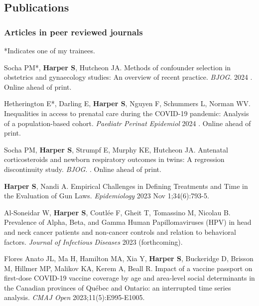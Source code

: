 \documentclass[
  letterpaper,
  DIV=11,
  numbers=noendperiod]{scrartcl}
\begin{document}
\hypertarget{publications}{%
\subsection{Publications}\label{publications}}

\hypertarget{articles-in-peer-reviewed-journals}{%
\subsubsection{Articles in peer reviewed
journals}\label{articles-in-peer-reviewed-journals}}

*Indicates one of my trainees.

\begin{etaremune}

\item Socha PM*, \textbf{Harper S}, Hutcheon JA. Methods of confounder selection in obstetrics and gynaecology studies: An overview of recent practice. \emph{BJOG}. 2024 . Online ahead of print.
 
\item Hetherington E*, Darling E, \textbf{Harper S}, Nguyen F, Schummers L, Norman WV. Inequalities in access to prenatal care during the COVID-19 pandemic: Analysis of a population-based cohort. \emph{Paediatr Perinat Epidemiol} 2024 . Online ahead of print.

\item *Socha PM, \textbf{Harper S}, Strumpf E, Murphy KE, Hutcheon JA. Antenatal corticosteroids and newborn respiratory outcomes in twins: A regression discontinuity study. \emph{BJOG}. . Online ahead of print.

\item \textbf{Harper S}, Nandi A. Empirical Challenges in Defining Treatments and Time in the Evaluation of Gun Laws. \emph{Epidemiology} 2023 Nov 1;34(6):793-5. 

\item *Al-Soneidar W, \textbf{Harper S}, Coutlée F, Gheit T, Tomassino M, Nicolau B. Prevalence of Alpha, Beta, and Gamma Human Papillomaviruses (HPV) in head and neck cancer patients and non-cancer controls and relation to behavioral factors. \emph{Journal of Infectious Diseases} 2023 (forthcoming). 

\item Flores Anato JL, Ma H, Hamilton MA, Xia Y, \textbf{Harper S}, Buckeridge D, Brisson M, Hillmer MP, Malikov KA, Kerem A, Beall R. Impact of a vaccine passport on first-dose COVID-19 vaccine coverage by age and area-level social determinants in the Canadian provinces of Québec and Ontario: an interrupted time series analysis. \emph{CMAJ Open} 2023;11(5):E995-E1005. 


\end{etaremune}
\end{document}
